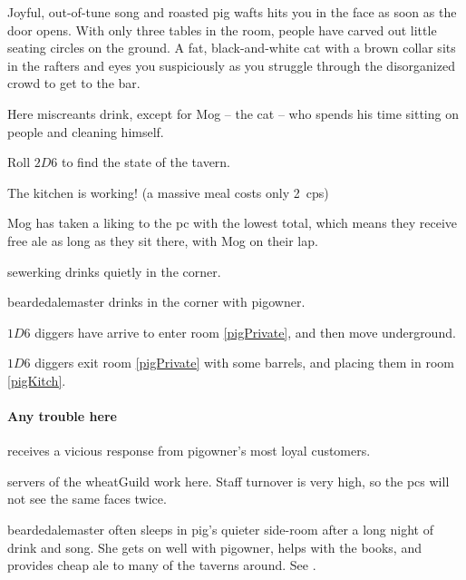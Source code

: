\begin{multicols}{2}
\begin{boxtext}
  Joyful, out-of-tune song and roasted pig wafts hits you in the face as soon as the door opens.
  With only three tables in the room, people have carved out little seating circles on the ground.
  A fat, black-and-white cat with a brown collar sits in the rafters and eyes you suspiciously as you struggle through the disorganized crowd to get to the bar.
\end{boxtext}
\label{pigCat}


Here miscreants drink, except for Mog -- the cat -- who spends his time sitting on people and cleaning himself.

Roll $2D6$ to find the state of the tavern.

\begin{dlist}
  \item
  The kitchen is working!
  (a massive meal costs only 2~\glspl{cp})
  \item
  Mog has taken a liking to the \gls{pc} with the lowest  total, which means they receive free ale as long as they sit there, with Mog on their lap.
  \item
  \Gls{sewerking} drinks quietly in the corner.
  \item
  \Gls{beardedalemaster} drinks in the corner with \gls{pigowner}.
  \item
  $1D6$ \glspl{digger} have arrive to enter room \vref{pigPrivate}, and then move underground.
  \item
  $1D6$ \glspl{digger} exit room \ref{pigPrivate} with some barrels, and placing them in room \vref{pigKitch}.
\end{dlist}

\paragraph{Any trouble here}
receives a vicious response from \gls{pigowner}'s most loyal customers.



\Glspl{server} of the \gls{wheatGuild} work here.
Staff turnover is very high, so the \glspl{pc} will not see the same faces twice.

\pigowner


\Gls{beardedalemaster} often sleeps in \gls{pig}'s quieter side-room after a long night of drink and song.
She gets on well with \gls{pigowner}, helps with the books, and provides cheap ale to many of the taverns around.
See .


\end{multicols}
